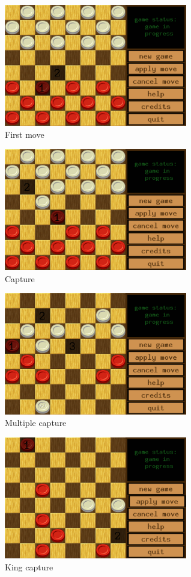 \documentclass[12pt,a5paper]{article}
\begin{document}
\begin{figure}[h]
	\centering
	\includegraphics[width=8cm]{img/first_move.png}
	\caption{First move}
	\label{fig:first_move}
\end{figure}
\begin{figure}[hp]
	\centering
	\includegraphics[width=8cm]{img/capture.png}
	\caption{Capture}
	\label{fig:capture}
\end{figure}
\begin{figure}[hp]
	\centering
	\includegraphics[width=8cm]{img/multiple_capture.png}
	\caption{Multiple capture}
	\label{fig:multiple_capture}
\end{figure}
\begin{figure}[hp]
	\centering
	\includegraphics[width=8cm]{img/capture_with_king2.png}
	\caption{King capture}
	\label{fig:capture_with_king}
\end{figure}
\end{document}

